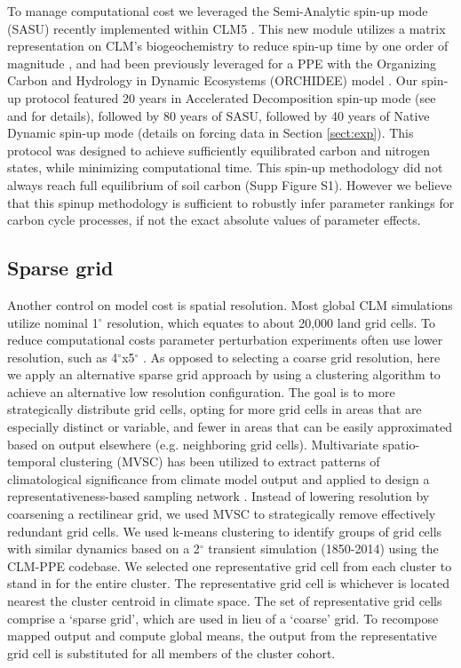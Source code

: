 \documentclass[draft]{agujournal2019}
\begin{document}
To manage computational cost we leveraged the Semi-Analytic spin-up mode (SASU) recently implemented within CLM5 \cite{lu2020,liao2023}. This new module utilizes a matrix representation on CLM's biogeochemistry to reduce spin-up time by one order of magnitude \cite{luo2022,liao2023}, and had been previously leveraged for a PPE with the Organizing Carbon and Hydrology in Dynamic Ecosystems (ORCHIDEE) model \cite{huang2018}. Our spin-up protocol featured 20 years in Accelerated Decomposition spin-up mode (see  and  for details), followed by 80 years of SASU, followed by 40 years of Native Dynamic spin-up mode (details on forcing data in Section \ref{sect:exp}). This protocol was designed to achieve sufficiently equilibrated carbon and nitrogen states, while minimizing computational time. This spin-up methodology did not always reach full equilibrium of soil carbon (Supp Figure S1). However we believe that this spinup methodology is sufficient to robustly infer parameter rankings for carbon cycle processes, if not the exact absolute values of parameter effects.

\subsection{Sparse grid}
\label{sect:sg}
Another control on model cost is spatial resolution. Most global CLM simulations utilize nominal 1$^\circ$ resolution, which equates to about 20,000 land grid cells. To reduce computational costs parameter perturbation experiments often use lower resolution, such as 4$^\circ$x5$^\circ$ \cite{dagon2020}. As opposed to selecting a coarse grid resolution, here we apply an alternative sparse grid approach by using a clustering algorithm to achieve an alternative low resolution configuration. The goal is to more strategically distribute grid cells, opting for more grid cells in areas that are especially distinct or variable, and fewer in areas that can be easily approximated based on output elsewhere (e.g. neighboring grid cells). 
Multivariate spatio-temporal clustering (MVSC) has been utilized to extract patterns of climatological significance from climate model output \cite{hoffman2005} and applied to design a representativeness-based sampling network \cite{hoffman2013}. Instead of lowering resolution by coarsening a rectilinear grid, we used MVSC to strategically remove effectively redundant grid cells. We used k-means clustering to identify groups of grid cells with similar dynamics based on a 2$^\circ$ transient simulation (1850-2014) using the CLM-PPE codebase. We selected one representative grid cell from each cluster to stand in for the entire cluster. The representative grid cell is whichever is located nearest the cluster centroid in climate space. The set of representative grid cells comprise a `sparse grid', which are used in lieu of a `coarse' grid. To recompose mapped output and compute global means, the output from the representative grid cell is substituted for all members of the cluster cohort.
\end{document}
